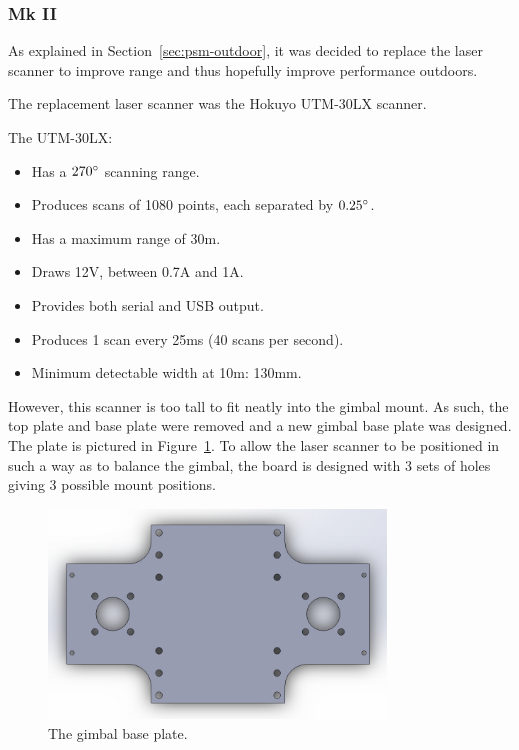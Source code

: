 \documentclass[12pt,oneside,a4paper]{book}
\begin{document}
\subsubsection{Mk II}
\label{sec:mk-ii}

As explained in Section~\ref{sec:psm-outdoor}, it was decided to
replace the laser scanner to improve range and thus hopefully improve
performance outdoors.

The replacement laser scanner was the Hokuyo UTM-30LX scanner. 

The UTM-30LX:
\begin{itemize}
\item Has a $270\degree$ scanning range.
\item Produces scans of 1080 points, each separated by $0.25\degree$.
\item Has a maximum range of 30m.
\item Draws 12V, between 0.7A and 1A.
\item Provides both serial and USB output.
\item Produces 1 scan every 25ms (40 scans per second).
\item Minimum detectable width at 10m: 130mm.
\end{itemize}

However, this scanner is too tall to fit neatly into the gimbal
mount. As such, the top plate and base plate were removed and a new
gimbal base plate was designed. The plate is pictured in
Figure~\ref{fig:baseplate}. To allow the laser scanner to be
positioned in such a way as to balance the gimbal, the board is
designed with 3 sets of holes giving 3 possible mount positions.

\begin{figure}[h]
  \centering
  \includegraphics[width=0.8\textwidth]{figs/baseplate}
  \caption{The gimbal base plate.}
  \label{fig:baseplate}
\end{figure}
\end{document}
